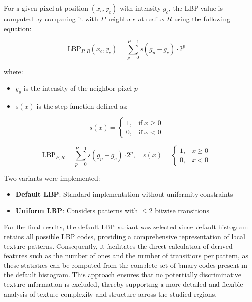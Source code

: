 \documentclass[a4paper,12pt]{report}
\begin{document}
For a given pixel at position $(x_c, y_c)$ with intensity $g_c$, the LBP value is computed by comparing it with $P$ neighbors at radius $R$ using the following equation:

\begin{equation}
\text{LBP}_{P,R}(x_c, y_c) = \sum_{p=0}^{P-1} s(g_p - g_c) \cdot 2^p
\end{equation}

where:
\begin{itemize}
    \item $g_p$ is the intensity of the neighbor pixel $p$
    \item $s(x)$ is the step function defined as:
\end{itemize}

\begin{equation}
s(x) = 
\begin{cases}
1, & \text{if } x \geq 0 \\
0, & \text{if } x < 0
\end{cases}
\end{equation}

\begin{equation}
\text{LBP}_{P,R} = \sum_{p=0}^{P-1} s(g_p - g_c) \cdot 2^p,\quad s(x) = 
\begin{cases}
1, & x \geq 0 \\
0, & x < 0
\end{cases}
\end{equation}

Two variants were implemented:
\begin{itemize}
    \item \textbf{Default LBP}: Standard implementation without uniformity constraints
    \item \textbf{Uniform LBP}: Considers patterns with $\leq 2$ bitwise transitions
\end{itemize}

For the final results, the default LBP variant was selected since default histogram retains all possible LBP codes, providing a comprehensive representation of local texture patterns. Consequently, it facilitates the direct calculation of derived features such as the number of ones and the number of transitions per pattern, as these statistics can be computed from the complete set of binary codes present in the default histogram. This approach ensures that no potentially discriminative texture information is excluded, thereby supporting a more detailed and flexible analysis of texture complexity and structure across the studied regions.
\end{document}
